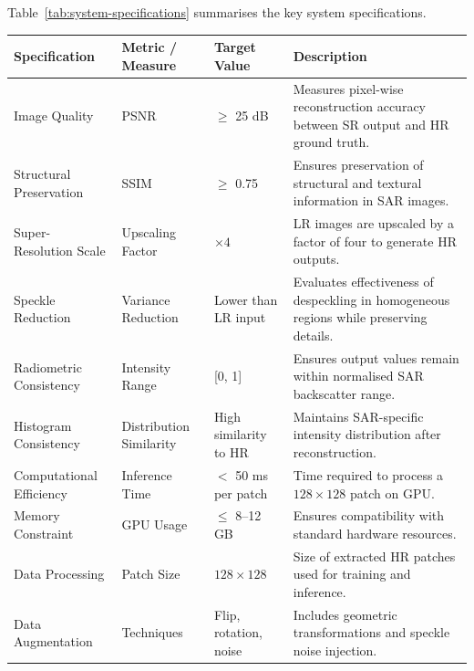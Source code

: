 \documentclass[conference]{IEEEtran}
\begin{document}
Table~\ref{tab:system-specifications} summarises the key system specifications.

\begin{table}[ht!]
    \centering
    \renewcommand{\arraystretch}{1.3}
    \begin{tabularx}{\textwidth}{p{3cm}XXX}
    \toprule
    \rowcolor{gray!20} \textbf{Specification} & \textbf{Metric / Measure} & \textbf{Target Value} & \textbf{Description} \\
    \midrule
    
    Image Quality & PSNR & $\geq$ 25 dB & Measures pixel-wise reconstruction accuracy between SR output and HR ground truth. \\
    
    Structural Preservation & SSIM & $\geq$ 0.75 & Ensures preservation of structural and textural information in SAR images. \\
    
    Super-Resolution Scale & Upscaling Factor & $\times 4$ & LR images are upscaled by a factor of four to generate HR outputs. \\
    
    Speckle Reduction & Variance Reduction & Lower than LR input & Evaluates effectiveness of despeckling in homogeneous regions while preserving details. \\
    
    Radiometric Consistency & Intensity Range & [0, 1] & Ensures output values remain within normalised SAR backscatter range. \\
    
    Histogram Consistency & Distribution Similarity & High similarity to HR & Maintains SAR-specific intensity distribution after reconstruction. \\
    
    Computational Efficiency & Inference Time & $<$ 50 ms per patch & Time required to process a $128 \times 128$ patch on GPU.\\
    
    Memory Constraint & GPU Usage & $\leq$ 8--12 GB & Ensures compatibility with standard hardware resources. \\
    
    Data Processing & Patch Size & $128 \times 128$ & Size of extracted HR patches used for training and inference. \\
    
    Data Augmentation & Techniques & Flip, rotation, noise & Includes geometric transformations and speckle noise injection. \\
    

\end{tabularx}
\end{table}
\end{document}
